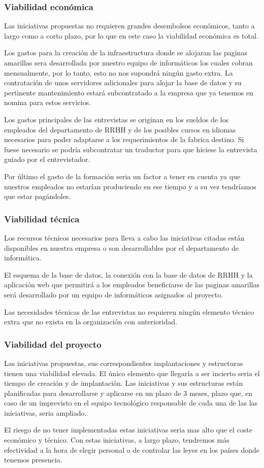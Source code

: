\documentclass[twoside]{article}
\begin{document}
\subsubsection{Viabilidad económica}
Las iniciativas propuestas no requieren grandes desembolsos económicos, tanto a largo como a corto plazo, por lo que en este caso la viabilidad económica es total.\par
Los gastos para la creación de la infraestructura donde se alojaran las paginas amarillas sera desarrollada por nuestro equipo de informáticos los cuales cobran mensualmente, por lo tanto, esto no nos supondrá ningún gasto extra. La contratación de unos servidores adicionales para alojar la base de datos y su pertinente mantenimiento estará subcontratado a la empresa que ya tenemos en nomina para estos servicios.\par
Los gastos principales de las entrevistas se originan en los sueldos de los empleados del departamento de RRHH y de los posibles cursos en idiomas necesarios para poder adaptarse a los requerimientos de la fabrica destino. Si fuese necesario se podría subcontratar un traductor para que hiciese la entrevista guiado por el entrevistador.\par
Por último el gasto de la formación seria un factor a tener en cuenta ya que nuestros empleados no estarían produciendo en ese tiempo y a su vez tendríamos que estar pagándoles.

\subsubsection{Viabilidad técnica}
Los recursos técnicos necesarios para lleva a cabo las iniciativas citadas están disponibles en nuestra empresa o son desarrollables por el departamento de informática.\par
El esquema de la base de datos, la conexión con la base de datos de RRHH y la aplicación web que permitirá a los empleados beneficiarse de las paginas amarillas será desarrollado por un equipo de informáticos asignados al proyecto. \par
Las necesidades técnicas de las entrevistas no requieren ningún elemento técnico extra que no exista en la organización con anterioridad.

\subsubsection{Viabilidad del proyecto}
Las iniciativas propuestas, sus correspondientes implantaciones y estructuras tienen una viabilidad elevada. El único elemento que llegaría a ser incierto seria el tiempo de creación y de implantación. Las iniciativas y sus estructuras están planificadas para desarrollarse y aplicarse en un plazo de 3 meses, plazo que, en caso de un imprevisto en el equipo tecnológico responsable de cada una de las las iniciativas, seria ampliado.\par
El riesgo de no tener implementadas estas iniciativas seria mas alto que el coste económico y técnico. Con estas iniciativas, a largo plazo, tendremos más efectividad a la hora de elegir personal o de controlar las leyes en los países donde tenemos presencia.
\end{document}
